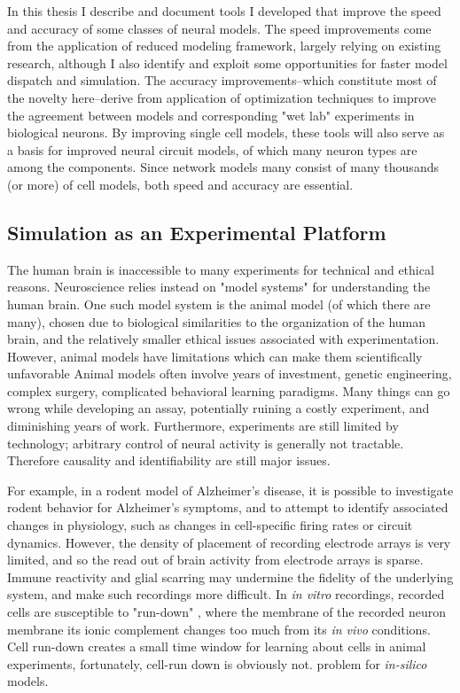 In this thesis I describe and document tools I developed that improve the speed and accuracy of some classes of neural models.
The speed improvements come from the application of reduced modeling framework, largely relying on existing research, although I also identify and exploit some opportunities for faster model dispatch and simulation.
The accuracy improvements--which constitute most of the novelty here--derive from application of optimization techniques to improve the agreement between models and corresponding "wet lab" experiments in biological neurons.
By improving single cell models, these tools will also serve as a basis for improved neural circuit models, of which many neuron types are among the components.
Since network models many consist of many thousands (or more) of cell models, both speed and accuracy are essential.
\\

\subsection{Simulation as an Experimental Platform}
The human brain is inaccessible to many experiments for technical and ethical reasons.
Neuroscience relies instead on "model systems" for understanding the human brain.
One such model system is the animal model (of which there are many), chosen due to biological similarities to the organization of the human brain, and the relatively smaller ethical issues associated with experimentation.
However, animal models have limitations which can make them scientifically unfavorable
Animal models often involve years of investment, genetic engineering, complex surgery, complicated behavioral learning paradigms.
Many things can go wrong while developing an assay, potentially ruining a costly experiment, and diminishing years of work.
Furthermore, experiments are still limited by technology; arbitrary control of neural activity is generally not tractable.
Therefore causality and identifiability are still major issues.

For example, in a rodent model of Alzheimer's disease, it is possible to investigate rodent behavior for Alzheimer's symptoms, and to attempt to identify associated changes in physiology, such as changes in cell-specific firing rates or circuit dynamics.
However, the density of placement of recording electrode arrays is very limited, and so the read out of brain activity from electrode arrays is sparse.
Immune reactivity and glial scarring may undermine the fidelity of the underlying system, and make such recordings more difficult.
In \emph{in vitro} recordings, recorded cells are susceptible to "run-down" \cite{colquhoun1994ion}, where the membrane of the recorded neuron membrane its ionic complement changes too much from its \emph{in vivo} conditions. 
Cell run-down creates a small time window for learning about cells in animal experiments, fortunately, cell-run down is obviously not. problem for \emph{in-silico} models.

